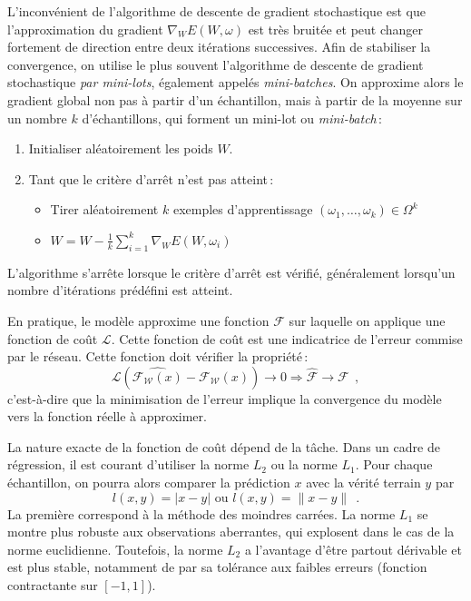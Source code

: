 L'inconvénient de l'algorithme de descente de gradient stochastique est que l'approximation du gradient $\nabla_W E(W, \omega)$ est très bruitée et peut changer fortement de direction entre deux itérations successives. Afin de stabiliser la convergence, on utilise le plus souvent l'algorithme de descente de gradient stochastique \emph{par mini-lots}, également appelés \emph{mini-batches}. On approxime alors le gradient global non pas à partir d'un échantillon, mais à partir de la moyenne sur un nombre $k$ d'échantillons, qui forment un mini-lot ou \emph{mini-batch}\,:
\begin{theorem}
  \begin{enumerate}
    \item Initialiser aléatoirement les poids $W$.
    \item Tant que le critère d'arrêt n'est pas atteint\,:
      \begin{itemize}
          \item Tirer aléatoirement $k$ exemples d'apprentissage $(\omega_1,\dots,\omega_k) \in \Omega^k$
          \item $W = W - \frac{1}{k} \sum_{i=1}^k \nabla_W E(W, \omega_i)$
      \end{itemize}
  \end{enumerate}
L'algorithme s'arrête lorsque le critère d'arrêt est vérifié, généralement lorsqu'un nombre d'itérations prédéfini est atteint.
\end{theorem}

En pratique, le modèle approxime une fonction $\mathcal{F}$ sur laquelle on applique une fonction de coût $\mathcal{L}$. Cette fonction de coût est une indicatrice de l'erreur commise par le réseau. Cette fonction doit vérifier la propriété\,:
$$\mathcal{L}(\hat{\mathcal{F_W}(x)} - \mathcal{F_W}(x)) \rightarrow 0 \Rightarrow \hat{\mathcal{F}} \rightarrow \mathcal{F}~~,$$
c'est-à-dire que la minimisation de l'erreur implique la convergence du modèle vers la fonction réelle à approximer.

La nature exacte de la fonction de coût dépend de la tâche. Dans un cadre de régression, il est courant d'utiliser la norme $L_2$ ou la norme $L_1$. Pour chaque échantillon, on pourra alors comparer la prédiction $x$ avec la vérité terrain $y$ par
$$l(x,y) = |x - y| \text{ ou } l(x,y) = \lVert x - y \rVert~~.$$
La première correspond à la méthode des moindres carrées. La norme $L_1$ se montre plus robuste aux observations aberrantes, qui explosent dans le cas de la norme euclidienne. Toutefois, la norme $L_2$ a l'avantage d'être partout dérivable et est plus stable, notamment de par sa tolérance aux faibles erreurs (fonction contractante sur $[-1, 1]$).

